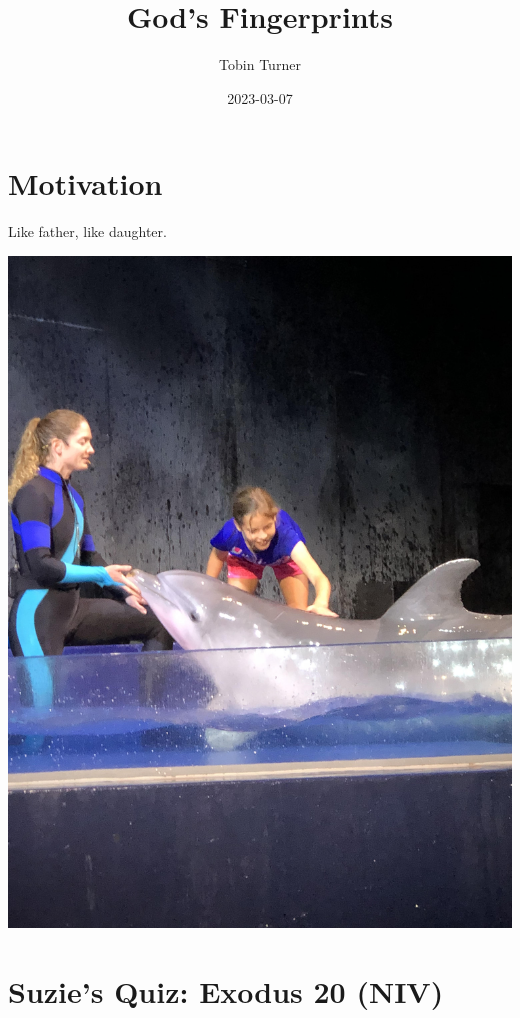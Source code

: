 \documentclass[
]{book}
\title{God's Fingerprints}
\author{Tobin Turner}
\date{2023-03-07}
\begin{document}
\maketitle

{
\setcounter{tocdepth}{1}
\tableofcontents
}
\hypertarget{motivation}{%
\chapter{Motivation}\label{motivation}}

Like father, like daughter.

\begin{center}\includegraphics[width=1\linewidth]{_images/meredith} \end{center}

\hypertarget{suzies-quiz-exodus-20-niv}{%
\chapter{Suzie's Quiz: Exodus 20 (NIV)}\label{suzies-quiz-exodus-20-niv}}
\end{document}
